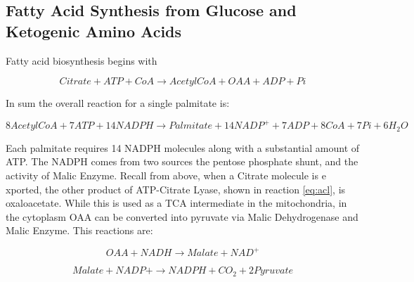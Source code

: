 \documentclass{tufte-handout}
\begin{document}
\subsection{Fatty Acid Synthesis from Glucose and Ketogenic Amino Acids}

Fatty acid biosynthesis begins with 

\begin{equation}\label{eq:acl}
Citrate + ATP + CoA \rightarrow AcetylCoA + OAA + ADP + Pi
\end{equation}

In sum the overall reaction for a single palmitate is:

\begin{equation}\label{eq:pamitate-overall}
8 AcetylCoA + 7 ATP + 14 NADPH \rightarrow Palmitate + 14 NADP^+ + 7 ADP + 8 CoA  + 7 Pi + 6H_2O
\end{equation}

  Each palmitate requires 14 NADPH molecules along with a substantial amount of ATP.  The NADPH comes from two sources the pentose phosphate shunt, and the activity of Malic Enzyme.  Recall from above, when a Citrate molecule is e xported, the other product of ATP-Citrate Lyase, shown in reaction \ref{eq:acl}, is oxaloacetate.  While this is used as a TCA intermediate in the mitochondria, in the cytoplasm OAA can be converted into pyruvate via Malic Dehydrogenase and Malic Enzyme.  This reactions are:

\begin{equation}\label{eq:me}
OAA + NADH  \rightarrow Malate + NAD^+
\end{equation}

\begin{equation}\label{eq:mdh}
Malate + NADP+  \rightarrow NADPH + CO_2 + 2 Pyruvate
\end{equation}
\end{document}
